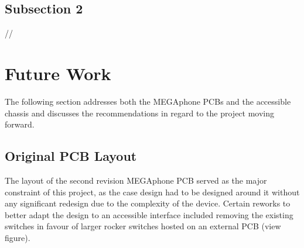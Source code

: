 \subsection{Subsection 2}
//


\section{Future Work}
The following section addresses both the MEGAphone PCBs and the accessible chassis and discusses the recommendations in regard to the project moving forward.

\subsection{Original PCB Layout}

The layout of the second revision MEGAphone PCB served as the major constraint of this project, as the case design had to be designed around it without any significant redesign due to the complexity of the device. 
Certain reworks to better adapt the design to an accessible interface included removing the existing switches in favour of larger rocker switches hosted on an external PCB (view figure).

